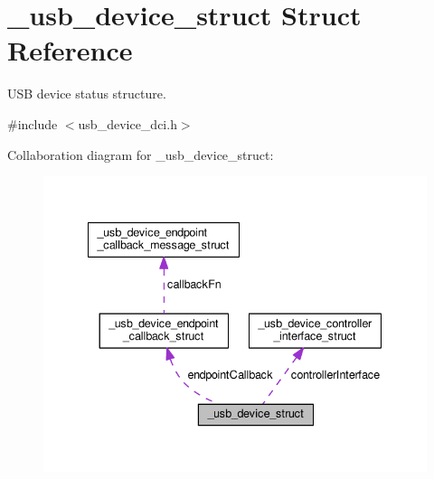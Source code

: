 \hypertarget{struct__usb__device__struct}{\section{\-\_\-usb\-\_\-device\-\_\-struct Struct Reference}
\label{struct__usb__device__struct}
}


U\-S\-B device status structure.  




{\ttfamily \#include $<$usb\-\_\-device\-\_\-dci.\-h$>$}



Collaboration diagram for \-\_\-usb\-\_\-device\-\_\-struct\-:
\nopagebreak
\begin{figure}[H]
\begin{center}
\leavevmode
\includegraphics[width=337pt]{struct__usb__device__struct__coll__graph}
\end{center}
\end{figure}
